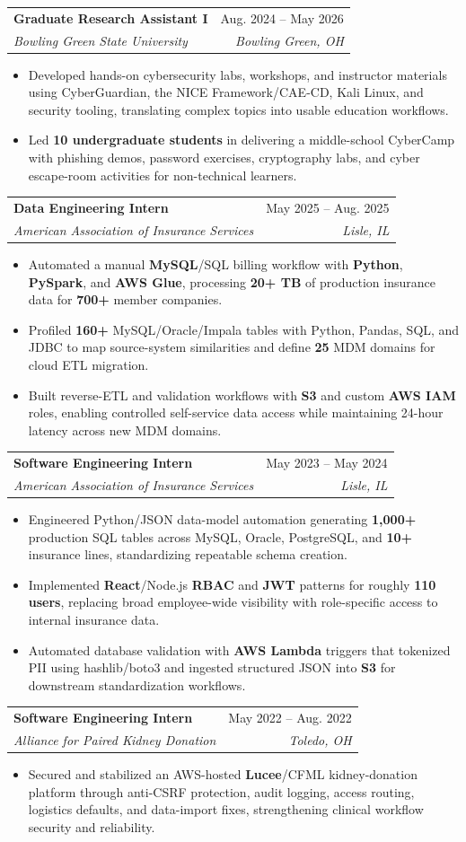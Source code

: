 \documentclass[letterpaper,11pt]{article}
\makeatletter
\newcommand{\resumeItem}[1]{
  \item\small{
    {#1 \vspace{-1pt}}
  }
}
\newcommand{\resumeSubheading}[4]{
  \vspace{-1pt}\item
    \begin{tabular*}{0.97\textwidth}[t]{l@{\extracolsep{\fill}}r}
      \textbf{#1} & #2 \\
      \textit{\small#3} & \textit{\small #4} \\
    \end{tabular*}\vspace{-3pt}
}
\newcommand{\resumeItemListStart}{\begin{itemize}[leftmargin=0.16in, itemsep=0pt, topsep=1pt, parsep=0pt]}
\newcommand{\resumeItemListEnd}{\end{itemize}\vspace{-4pt}}
\makeatother
\begin{document}
    \resumeSubheading
      {Graduate Research Assistant I}{Aug. 2024 -- May 2026}
      {Bowling Green State University}{Bowling Green, OH}
      \resumeItemListStart
        \resumeItem{Developed hands-on cybersecurity labs, workshops, and instructor materials using CyberGuardian, the NICE Framework/CAE-CD, Kali Linux, and security tooling, translating complex topics into usable education workflows.}
        \resumeItem{Led \textbf{10 undergraduate students} in delivering a middle-school CyberCamp with phishing demos, password exercises, cryptography labs, and cyber escape-room activities for non-technical learners.}
      \resumeItemListEnd

    \resumeSubheading
      {Data Engineering Intern}{May 2025 -- Aug. 2025}
      {American Association of Insurance Services}{Lisle, IL}
      \resumeItemListStart
        \resumeItem{Automated a manual \textbf{MySQL}/SQL billing workflow with \textbf{Python}, \textbf{PySpark}, and \textbf{AWS Glue}, processing \textbf{20+ TB} of production insurance data for \textbf{700+} member companies.}
        \resumeItem{Profiled \textbf{160+} MySQL/Oracle/Impala tables with Python, Pandas, SQL, and JDBC to map source-system similarities and define \textbf{25} MDM domains for cloud ETL migration.}
        \resumeItem{Built reverse-ETL and validation workflows with \textbf{S3} and custom \textbf{AWS IAM} roles, enabling controlled self-service data access while maintaining 24-hour latency across new MDM domains.}
      \resumeItemListEnd

    \resumeSubheading
      {Software Engineering Intern}{May 2023 -- May 2024}
      {American Association of Insurance Services}{Lisle, IL}
      \resumeItemListStart
        \resumeItem{Engineered Python/JSON data-model automation generating \textbf{1,000+} production SQL tables across MySQL, Oracle, PostgreSQL, and \textbf{10+} insurance lines, standardizing repeatable schema creation.}
        \resumeItem{Implemented \textbf{React}/Node.js \textbf{RBAC} and \textbf{JWT} patterns for roughly \textbf{110 users}, replacing broad employee-wide visibility with role-specific access to internal insurance data.}
        \resumeItem{Automated database validation with \textbf{AWS Lambda} triggers that tokenized PII using hashlib/boto3 and ingested structured JSON into \textbf{S3} for downstream standardization workflows.}
      \resumeItemListEnd

    \resumeSubheading
      {Software Engineering Intern}{May 2022 -- Aug. 2022}
      {Alliance for Paired Kidney Donation}{Toledo, OH}
      \resumeItemListStart
        \resumeItem{Secured and stabilized an AWS-hosted \textbf{Lucee}/CFML kidney-donation platform through anti-CSRF protection, audit logging, access routing, logistics defaults, and data-import fixes, strengthening clinical workflow security and reliability.}
      \resumeItemListEnd
\end{document}
